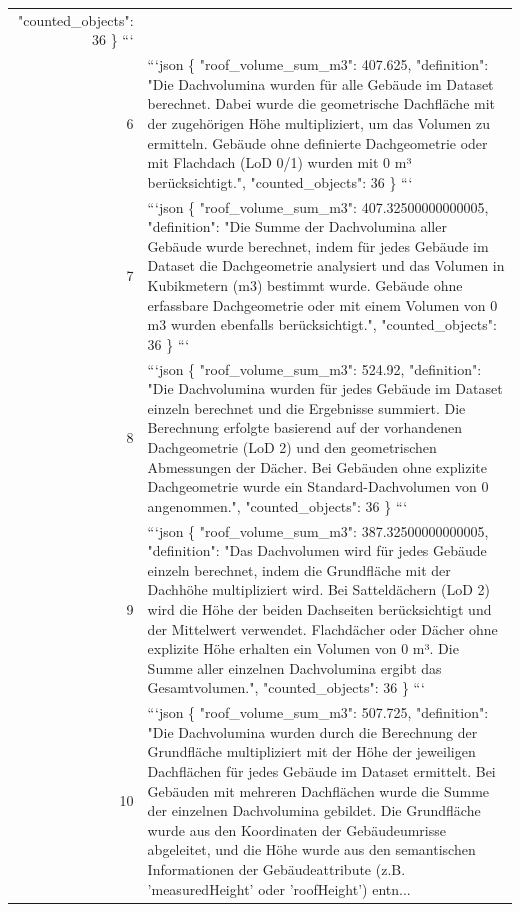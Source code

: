 \documentclass[a4paper,11pt]{article}
\begin{document}
\begin{table}[ht]
\begin{tabular}{r p{12cm}}
  "counted\_objects": 36
\}
``` \\
6 & ```json
\{
  "roof\_volume\_sum\_m3": 407.625,
  "definition": "Die Dachvolumina wurden für alle Gebäude im Dataset berechnet. Dabei wurde die geometrische Dachfläche mit der zugehörigen Höhe multipliziert, um das Volumen zu ermitteln. Gebäude ohne definierte Dachgeometrie oder mit Flachdach (LoD 0/1) wurden mit 0 m³ berücksichtigt.",
  "counted\_objects": 36
\}
``` \\
7 & ```json
\{
  "roof\_volume\_sum\_m3": 407.32500000000005,
  "definition": "Die Summe der Dachvolumina aller Gebäude wurde berechnet, indem für jedes Gebäude im Dataset die Dachgeometrie analysiert und das Volumen in Kubikmetern (m3) bestimmt wurde. Gebäude ohne erfassbare Dachgeometrie oder mit einem Volumen von 0 m3 wurden ebenfalls berücksichtigt.",
  "counted\_objects": 36
\}
``` \\
8 & ```json
\{
  "roof\_volume\_sum\_m3": 524.92,
  "definition": "Die Dachvolumina wurden für jedes Gebäude im Dataset einzeln berechnet und die Ergebnisse summiert. Die Berechnung erfolgte basierend auf der vorhandenen Dachgeometrie (LoD 2) und den geometrischen Abmessungen der Dächer. Bei Gebäuden ohne explizite Dachgeometrie wurde ein Standard-Dachvolumen von 0 angenommen.",
  "counted\_objects": 36
\}
``` \\
9 & ```json
\{
  "roof\_volume\_sum\_m3": 387.32500000000005,
  "definition": "Das Dachvolumen wird für jedes Gebäude einzeln berechnet, indem die Grundfläche mit der Dachhöhe multipliziert wird. Bei Satteldächern (LoD 2) wird die Höhe der beiden Dachseiten berücksichtigt und der Mittelwert verwendet. Flachdächer oder Dächer ohne explizite Höhe erhalten ein Volumen von 0 m³. Die Summe aller einzelnen Dachvolumina ergibt das Gesamtvolumen.",
  "counted\_objects": 36
\}
``` \\
10 & ```json
\{
  "roof\_volume\_sum\_m3": 507.725,
  "definition": "Die Dachvolumina wurden durch die Berechnung der Grundfläche multipliziert mit der Höhe der jeweiligen Dachflächen für jedes Gebäude im Dataset ermittelt. Bei Gebäuden mit mehreren Dachflächen wurde die Summe der einzelnen Dachvolumina gebildet. Die Grundfläche wurde aus den Koordinaten der Gebäudeumrisse abgeleitet, und die Höhe wurde aus den semantischen Informationen der Gebäudeattribute (z.B. 'measuredHeight' oder 'roofHeight') entn... \\
\hline
\end{tabular}
\end{table}
\end{document}
